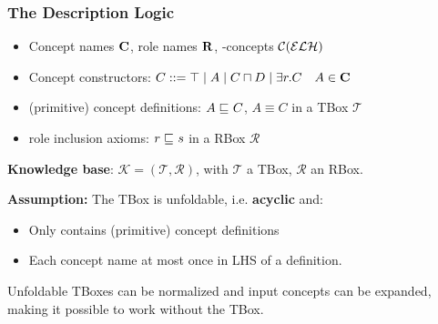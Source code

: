 \documentclass[smaller, dvipsnames]{beamer}
\begin{document}
\begin{frame}
  \frametitle{The \elh{} Description Logic}
  \begin{block}{\elh}
    \begin{itemize}
      \item Concept names \(\mathbf{C}\), role names \(\mathbf{R}\), \elh-concepts \(\mathcal{C}(\mathcal{ELH})\)
      \item \alert{Concept constructors}: \(C ::= \top \mid A \mid C \sqcap D \mid \exists{}r.C \quad A \in \mathbf{C}\)
      \item (primitive) \alert{concept definitions}: \(A \sqsubseteq_{\mathcal{}} C\), \(A \equiv C\) in a \alert{TBox} \(\mathcal{T}\)
      \item \alert{role inclusion axioms}: \(r \sqsubseteq_{\mathcal{}} s\) in a \alert{RBox} \(\mathcal{R}\)
    \end{itemize}
  \end{block}
  \onslide<+->
  \textbf{Knowledge base}: \(\mathcal{K} = (\mathcal{T}, \mathcal{R})\), with \(\mathcal{T}\) a TBox, \(\mathcal{R}\) an RBox.
  
  \onslide<+->
  \textbf{Assumption:} The TBox is \alert{unfoldable},
  i.e. \textbf{acyclic} and:
  \begin{itemize}
    \item Only contains (primitive) concept definitions
    \item Each concept name at most once in LHS of a definition.
  \end{itemize}
  Unfoldable TBoxes can be \alert{normalized} and input concepts can be expanded, making it possible to work without the TBox.
\end{frame}
\end{document}
